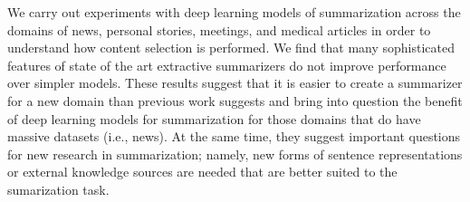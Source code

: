 We carry out experiments with deep learning models of summarization across the domains of news, personal stories, meetings, and medical articles in order to understand how content selection is performed. We find that many sophisticated features of state of the art extractive summarizers do not improve performance over simpler models. These results suggest that it is easier to create a summarizer for a new domain than previous work suggests and bring into question the benefit of deep learning models for summarization for those domains that do have massive datasets (i.e., news). At the same time, they suggest important questions for new research in summarization; namely, new forms of sentence representations or external knowledge sources are needed that are better suited to the sumarization task.
